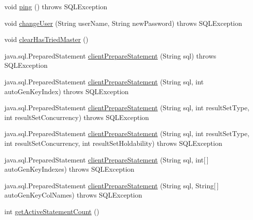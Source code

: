 \begin{DoxyCompactItemize}
\item 
void \mbox{\hyperlink{classcom_1_1mysql_1_1cj_1_1jdbc_1_1_connection_wrapper_af9d635c00b09fc14bff63eeeec9b354d}{ping}} ()  throws S\+Q\+L\+Exception 
\item 
void \mbox{\hyperlink{classcom_1_1mysql_1_1cj_1_1jdbc_1_1_connection_wrapper_a326d50e31598342bcc2c4273967f3020}{change\+User}} (String user\+Name, String new\+Password)  throws S\+Q\+L\+Exception 
\item 
void \mbox{\hyperlink{classcom_1_1mysql_1_1cj_1_1jdbc_1_1_connection_wrapper_a8279c8cf76edfd6247bf3d3e2a969cae}{clear\+Has\+Tried\+Master}} ()
\item 
java.\+sql.\+Prepared\+Statement \mbox{\hyperlink{classcom_1_1mysql_1_1cj_1_1jdbc_1_1_connection_wrapper_abec439c58b0b01c1590be391a2d1969a}{client\+Prepare\+Statement}} (String sql)  throws S\+Q\+L\+Exception 
\item 
java.\+sql.\+Prepared\+Statement \mbox{\hyperlink{classcom_1_1mysql_1_1cj_1_1jdbc_1_1_connection_wrapper_a1dc0327172d67ed88fce75b54c5a87d8}{client\+Prepare\+Statement}} (String sql, int auto\+Gen\+Key\+Index)  throws S\+Q\+L\+Exception 
\item 
java.\+sql.\+Prepared\+Statement \mbox{\hyperlink{classcom_1_1mysql_1_1cj_1_1jdbc_1_1_connection_wrapper_ac83890b870c7881f93d8907216be47ee}{client\+Prepare\+Statement}} (String sql, int result\+Set\+Type, int result\+Set\+Concurrency)  throws S\+Q\+L\+Exception 
\item 
java.\+sql.\+Prepared\+Statement \mbox{\hyperlink{classcom_1_1mysql_1_1cj_1_1jdbc_1_1_connection_wrapper_ae60c9942657fd3686a4bbe8f21d05050}{client\+Prepare\+Statement}} (String sql, int result\+Set\+Type, int result\+Set\+Concurrency, int result\+Set\+Holdability)  throws S\+Q\+L\+Exception 
\item 
java.\+sql.\+Prepared\+Statement \mbox{\hyperlink{classcom_1_1mysql_1_1cj_1_1jdbc_1_1_connection_wrapper_a1fc94fe8ebcc323191215f63aad419ff}{client\+Prepare\+Statement}} (String sql, int\mbox{[}$\,$\mbox{]} auto\+Gen\+Key\+Indexes)  throws S\+Q\+L\+Exception 
\item 
java.\+sql.\+Prepared\+Statement \mbox{\hyperlink{classcom_1_1mysql_1_1cj_1_1jdbc_1_1_connection_wrapper_acae69d4edeb44d1ecd2f6750e0312341}{client\+Prepare\+Statement}} (String sql, String\mbox{[}$\,$\mbox{]} auto\+Gen\+Key\+Col\+Names)  throws S\+Q\+L\+Exception 
\item 
int \mbox{\hyperlink{classcom_1_1mysql_1_1cj_1_1jdbc_1_1_connection_wrapper_ad356fedacaf160823158cc253f99322a}{get\+Active\+Statement\+Count}} ()

\end{DoxyCompactItemize}
